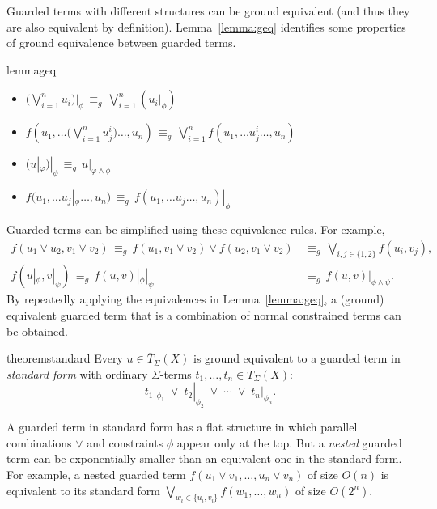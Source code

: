 Guarded terms with different structures can be ground equivalent (and
thus they are also equivalent by definition).  Lemma~\ref{lemma:geq}
identifies some properties of ground equivalence between guarded
terms.


\begin{restatable}{lemma}{geq}
\label{lemma:geq}
\begin{itemize}
	\item $\big(\bigvee_{i=1}^n u_i \big) |_\phi \,\equiv_g\, \bigvee_{i=1}^n (u_i  |_\phi)$
	
	\item $ f(u_1,\ldots \big(\bigvee_{i=1}^n u_j^i\big) \ldots,u_n) \,\equiv_g\, \bigvee_{i=1}^n f(u_1,\ldots u_j^i \ldots,u_n)$

	\item $\big(u |_\varphi\big) |_\phi \,\equiv_g\, u |_{\varphi \wedge \phi}$
	
	\item $f(u_1,\ldots u_j |_\phi \ldots,u_n) \,\equiv_g\, f(u_1,\ldots u_j \ldots,u_n) |_\phi$ 

\end{itemize}
\end{restatable}

\noindent Guarded terms can be simplified using these equivalence
rules.  For example, 
\begin{align*}
f(u_1 \vee u_2, v_1 \vee v_2) \,\equiv_g\,
f(u_1, v_1 \vee v_2) \vee f(u_2, v_1 \vee v_2) &\,\equiv_g\,
\textstyle
\bigvee_{i,j \in \{1,2\}} f(u_i,v_j),
\\
f(u |_{\phi}, v |_{\psi})
\,\equiv_g\, f(u, v) |_{\phi} |_{\psi} &\,\equiv_g\, f(u, v) |_{\phi
  \wedge \psi}.
\end{align*}
By repeatedly applying the equivalences in
Lemma~\ref{lemma:geq}, a (ground) equivalent guarded term that is a
combination of normal constrained terms can be obtained.


\begin{restatable}{theorem}{standard}
\label{thm:standard}
Every $u \in \overline{T}_{\Sigma}(X)$ is ground equivalent to a
guarded term in \emph{standard form} with ordinary $\Sigma$-terms
$t_1, \ldots, t_n \in T_\Sigma(X)$:
\[
t_1 |_{\phi_1}
\;\vee\;
t_2 |_{\phi_2}
\;\vee\;
\cdots 
\;\vee\;
t_n |_{\phi_n}.
\]
\end{restatable}

\noindent A guarded term in standard form has a flat structure in
which parallel combinations $\vee$ and constraints $\phi$ appear only
at the top.  But a \emph{nested} guarded term can be exponentially
smaller than an equivalent one in the standard form.  For example, a
nested guarded term $f(u_1 \vee v_1, \ldots, u_n \vee v_n)$ of size
$O(n)$ is equivalent to its standard form $\bigvee_{w_i \in \{u_i,
  v_i\}} f(w_1, \ldots, w_n)$ of size $O(2^n)$.

